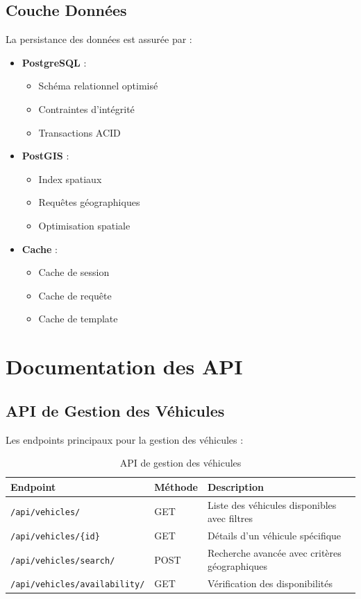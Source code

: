 \subsection{Couche Données}
La persistance des données est assurée par :

\begin{itemize}
    \item \textbf{PostgreSQL} :
    \begin{itemize}
        \item Schéma relationnel optimisé
        \item Contraintes d'intégrité
        \item Transactions ACID
    \end{itemize}
    
    \item \textbf{PostGIS} :
    \begin{itemize}
        \item Index spatiaux
        \item Requêtes géographiques
        \item Optimisation spatiale
    \end{itemize}
    
    \item \textbf{Cache} :
    \begin{itemize}
        \item Cache de session
        \item Cache de requête
        \item Cache de template
    \end{itemize}
\end{itemize}

\section{Documentation des API}

\subsection{API de Gestion des Véhicules}
Les endpoints principaux pour la gestion des véhicules :

\begin{table}[h]
\centering
\begin{tabular}{|p{3cm}|p{2cm}|p{8cm}|}
\hline
\textbf{Endpoint} & \textbf{Méthode} & \textbf{Description} \\
\hline
\texttt{/api/vehicles/} & GET & Liste des véhicules disponibles avec filtres \\
\hline
\texttt{/api/vehicles/\{id\}} & GET & Détails d'un véhicule spécifique \\
\hline
\texttt{/api/vehicles/search/} & POST & Recherche avancée avec critères géographiques \\
\hline
\texttt{/api/vehicles/availability/} & GET & Vérification des disponibilités \\
\hline
\end{tabular}
\caption{API de gestion des véhicules}
\label{tab:vehicle_api}
\end{table}

